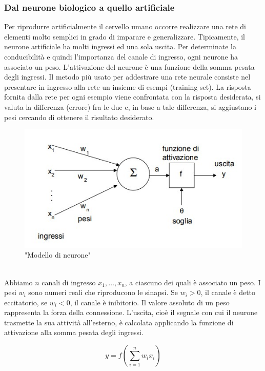 \documentclass[a4paper,11pt]{article}
\begin{document}
    \subsubsection{Dal neurone biologico a quello artificiale}
    Per riprodurre artificialmente il cervello umano occorre realizzare
    una rete di elementi molto semplici in grado di imparare e generalizzare.
    Tipicamente, il neurone artificiale ha molti ingressi ed una sola uscita.
    Per determinate la conducibilità e quindi l'importanza del canale di ingresso, ogni neurone ha associato un peso. 
    L’attivazione del neurone è una funzione della somma pesata degli ingressi. 
    Il metodo più usato per addestrare una rete neurale consiste nel presentare
    in ingresso alla rete un insieme di esempi (training set). La risposta fornita
    dalla rete per ogni esempio viene confrontata con la risposta desiderata, si
    valuta la differenza (errore) fra le due e, in base a tale differenza, si
    aggiustano i pesi cercando di ottenere il risultato desiderato.
    \begin{figure}[h]
        \centering
        \includegraphics{neurone.jpg}
        \caption{"Modello di neurone"}
    \end{figure}
    \\Abbiamo $n$ canali di ingresso $x_1, …, x_n$, a ciascuno dei quali è associato un peso. 
    I pesi $w_i$ sono numeri reali che riproducono le sinapsi. Se $w_i > 0$, il canale è detto eccitatorio, se $w_i < 0$, il canale è inibitorio. 
    Il valore assoluto di un peso rappresenta la forza della connessione. 
    L’uscita, cioè il segnale con cui il neurone trasmette la sua attività
    all’esterno, è calcolata applicando la funzione di attivazione alla somma
    pesata degli ingressi. 
    \begin {center}
    \Large $$y = f(\sum_{i=1}^{n}w_i x_i) $$
    \end{center}
    \newpage
\end{document}
